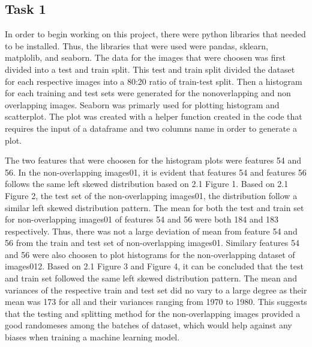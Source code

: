 \documentclass[12pt]{article}
\begin{document}
\begin{multicols*}{2}
  \section{Task 1}
  \hspace*{5mm} In order to begin working on this project, there were python libraries that needed to be installed. Thus, the libraries that were used were pandas, sklearn, matplolib,
  and seaborn. The data for the images that were choosen was first divided into a test and train split. This test and train split divided the dataset for each
  respective images into a 80:20 ratio of train-test split. Then a histogram for each training and test sets were generated for the nonoverlapping and non overlapping images.
  Seaborn was primarly used for plotting histogram and scatterplot. The plot was created with a helper function created in the code that requires the input of
  a dataframe and two columns name in order to generate a plot. 
  
  \hspace*{5mm} The two features that were choosen for the histogram plots were features 54 and 56. In the non-overlapping images01, it is
  evident that features 54 and features 56 follows the same left skewed distribution based on 2.1 Figure 1. Based on 2.1 Figure 2, the test set of the non-overlapping images01,
  the distribution follow a similar left skewed distribution pattern. The mean for both the test and train set for non-overlapping images01 of features 54 
  and 56 were both 184 and 183 respectively. Thus, there was not a large deviation of mean from feature 54 and 56 from the train and test set of non-overlapping
  images01. Similary features 54 and 56 were also choosen to plot histograms for the non-overlapping dataset of images012. Based on 2.1 Figure 3 and Figure 4, 
  it can be concluded that the test and train set followed the same left skewed distribution pattern. The mean and variances of the respective train and test
  set did no vary to a large degree as their mean was 173 for all and their variances ranging from 1970 to 1980. This suggests that the testing and splitting 
  method for the non-overlapping images provided a good randomeses among the batches of dataset, which would help against any biases when training a machine learning
  model.


\end{multicols*}
\end{document}
